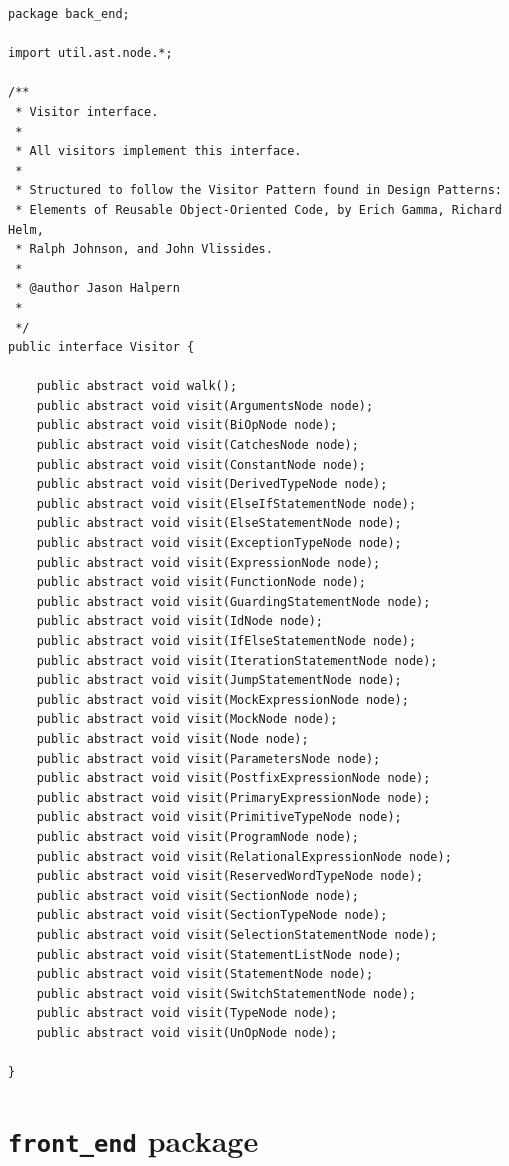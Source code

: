 \documentclass{book}
\begin{document}
\begin{verbatim}
package back_end;

import util.ast.node.*;

/**
 * Visitor interface.
 * 
 * All visitors implement this interface.
 * 
 * Structured to follow the Visitor Pattern found in Design Patterns:
 * Elements of Reusable Object-Oriented Code, by Erich Gamma, Richard Helm,
 * Ralph Johnson, and John Vlissides.
 * 
 * @author Jason Halpern
 *
 */
public interface Visitor {
	
	public abstract void walk();
	public abstract void visit(ArgumentsNode node);
	public abstract void visit(BiOpNode node);
	public abstract void visit(CatchesNode node);
	public abstract void visit(ConstantNode node);
	public abstract void visit(DerivedTypeNode node);
	public abstract void visit(ElseIfStatementNode node);
	public abstract void visit(ElseStatementNode node);
	public abstract void visit(ExceptionTypeNode node);
	public abstract void visit(ExpressionNode node);
	public abstract void visit(FunctionNode node);
	public abstract void visit(GuardingStatementNode node);
	public abstract void visit(IdNode node);
	public abstract void visit(IfElseStatementNode node);
	public abstract void visit(IterationStatementNode node);
	public abstract void visit(JumpStatementNode node);
	public abstract void visit(MockExpressionNode node);
	public abstract void visit(MockNode node);
	public abstract void visit(Node node);
	public abstract void visit(ParametersNode node);
	public abstract void visit(PostfixExpressionNode node);
	public abstract void visit(PrimaryExpressionNode node);
	public abstract void visit(PrimitiveTypeNode node);
	public abstract void visit(ProgramNode node);
	public abstract void visit(RelationalExpressionNode node);
	public abstract void visit(ReservedWordTypeNode node);
	public abstract void visit(SectionNode node);
	public abstract void visit(SectionTypeNode node);
	public abstract void visit(SelectionStatementNode node);
	public abstract void visit(StatementListNode node);
	public abstract void visit(StatementNode node);
	public abstract void visit(SwitchStatementNode node);
	public abstract void visit(TypeNode node);
	public abstract void visit(UnOpNode node);

}
\end{verbatim}

\section{\texttt{front\_end} package}
\end{document}
